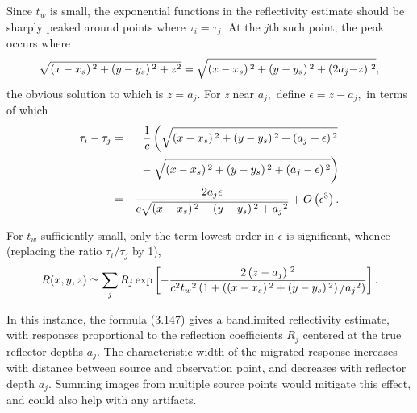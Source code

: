 Since \(t_w\) is small, the exponential functions in the reflectivity estimate should be sharply peaked around points where \(\tau _i=\tau _j.\)
At the \(j{\text{th}}\) such point, the peak occurs where
\begin{equation}\sqrt{\left(\text{\textit{$x$}}-\text{\textit{$x_s$}}\right){}^2+\left(\text{\textit{$y$}}-\text{\textit{$y_s$}}\right){}^2+\text{\textit{$z$}}^2}=\sqrt{\left(\text{\textit{$x$}}-\text{\textit{$x_s$}}\right){}^2+\left(\text{\textit{$y$}}-\text{\textit{$y_s$}}\right){}^2+\left(2\text{\textit{$a$}}_{\text{\textit{$j$}}}\text{\textit{$-$}}\text{\textit{$z$}}\text{\textit{$)$}}\right.{}^2},\end{equation}
the obvious solution to which is \(z=a_j.\) For \textit{z} near \(a_j,\) define \(\epsilon =z-a_j,\) in terms of which
\begin{eqnarray}
\tau _{\text{\textit{$i$}}}-\tau _{\text{\textit{$j$}}} & = & \frac{1}{\text{\textit{$c$}}}\left(\sqrt{\left(\text{\textit{$x$}}-\text{\textit{$x_s$}}\right){}^2
+\left(\text{\textit{$y$}}-\text{\textit{$y_s$}}\right){}^2+\left(\text{\textit{$a_j$}}+\epsilon
\right){}^2}\right.\nonumber\\
 &&- \left.\sqrt{\left(\text{\textit{$x$}}-\text{\textit{$x_s$}}\right){}^2
+\left(\text{\textit{$y$}}-\text{\textit{$y_s$}}\right){}^2+\left(\text{\textit{$a_j$}}-{\epsilon}\right){}^2}\right)
\nonumber\\
& = & \frac{2 \text{\textit{$a_j$}}\epsilon }{\text{\textit{$c$}}\sqrt{\left(\text{\textit{$x$}}-\text{\textit{$x_s$}}\right){}^2+\left(\text{\textit{$y$}}-\text{\textit{$y_s$}}\right){}^2+\text{\textit{$a_j$}}{}^2}}+O\left(\epsilon
^3\right).
\end{eqnarray}

For \(t_w\) sufficiently small, only the term lowest order in $\epsilon $ is significant, whence (replacing the ratio \(\tau _i/\tau _j\) by 1),
\begin{equation}\text{\textit{$R(x,y,z)$}}\simeq \sum _{\text{\textit{$j$}}} \text{\textit{$R$}}_{\text{\textit{$j$}}}\,\text{exp}\left[-\frac{2\left(\text{\textit{$z-a_j$}}\text{\textit{$)$}}\right.{}^2}{\text{\textit{$c
$}}^2\text{\textit{$t_w$}}{}^2\left(1+\left(\left(\text{\textit{$x$}}-\text{\textit{$x_s$}}\right){}^2+\left(\text{\textit{$y$}}-\text{\textit{$y_s$}}\right){}^2\right)/\text{\textit{$a_j$}}{}^2\right)}\right].
\end{equation}

In this instance, the formula (3.147) gives a bandlimited reflectivity estimate, with responses proportional to the reflection coefficients \(R_j\)
centered at the true reflector depths \(a_j\). The characteristic width of the migrated response increases with distance between source and observation
point, and decreases with reflector depth \(a_j\). Summing images from multiple source points would mitigate this effect, and could also help
with any artifacts.

